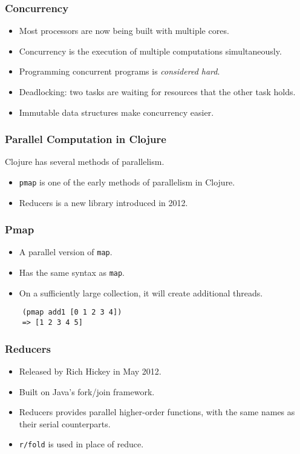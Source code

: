 \documentclass{beamer}
\newcommand{\clocode}[1]{{\texttt {#1}}}
\begin{document}
\begin{frame}
\frametitle{Concurrency}
	\begin{itemize}
	 \item Most processors are now being built with multiple cores.
	 \item Concurrency is the execution of multiple computations simultaneously.
	 \item Programming concurrent programs is \textit{considered hard}.
	 \item Deadlocking: two tasks are waiting for resources that the other task holds.
	 \item Immutable data structures make concurrency easier.
	\end{itemize}	
\end{frame}
\begin{frame}
\frametitle{Parallel Computation in Clojure}
	Clojure has several methods of parallelism.
	\begin{itemize}
	\item \clocode{pmap} is one of the early methods of parallelism in Clojure.
	\item Reducers is a new library introduced in 2012.
	\end{itemize}
\end{frame}
\begin{frame}[fragile]
\frametitle{Pmap}
	\begin{itemize}
	 \item A parallel version of \clocode{map}.
	 \item Has the same syntax as \clocode{map}.
	 \item On a sufficiently large collection, it will create additional threads.
	\end{itemize}	
	\begin{verbatim} 
	(pmap add1 [0 1 2 3 4])
	=> [1 2 3 4 5]
	\end{verbatim}
\end{frame}
\begin{frame}[fragile]
\frametitle{Reducers}
	\begin{itemize}
	 \item Released by Rich Hickey in May 2012.
	 \item Built on Java's fork/join framework.
	 \item Reducers provides parallel higher-order functions, with the same names as their serial counterparts.
	 \item \clocode{r/fold} is used in place of reduce.
	\end{itemize}
\end{frame}
\end{document}
